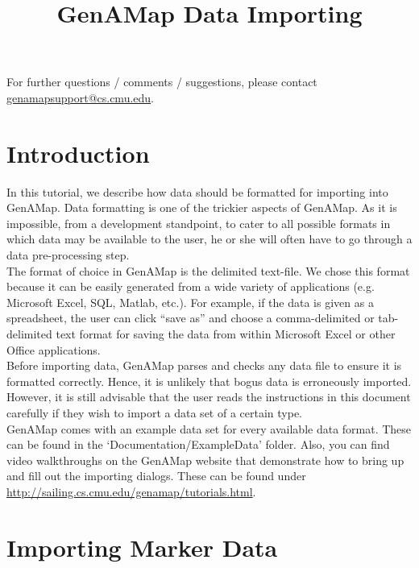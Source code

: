 \documentclass{article}
\title{GenAMap Data Importing}
\author{}
\date{}
\begin{document}
\maketitle
\tableofcontents
\vspace{1cm}

For further questions / comments / suggestions, please contact \url{genamapsupport@cs.cmu.edu}.

\section{Introduction}

In this tutorial, we describe how data should be formatted for importing into GenAMap. Data formatting is one of the trickier aspects of GenAMap. As it is impossible, from a development standpoint, to cater to all possible formats in which data may be available to the user, he or she will often have to go through a data pre-processing step. \\

The format of choice in GenAMap is the delimited text-file. We chose this format because it can be easily generated from a wide variety of applications (e.g. Microsoft Excel, SQL, Matlab, etc.). For example, if the data is given as a spreadsheet, the user can click ``save as'' and choose a comma-delimited or tab-delimited text format for saving the data from within Microsoft Excel or other Office applications. \\

Before importing data, GenAMap parses and checks any data file to ensure it is formatted correctly. Hence, it is unlikely that bogus data is erroneously imported. However, it is still advisable that the user reads the instructions in this document carefully if they wish to import a data set of a certain type. \\

GenAMap comes with an example data set for every available data format. These can be found in the `Documentation/ExampleData' folder. Also, you can find video walkthroughs on the GenAMap website that demonstrate how to bring up and fill out the importing dialogs. These can be found under \url{http://sailing.cs.cmu.edu/genamap/tutorials.html}.

\section{Importing Marker Data}
\end{document}
